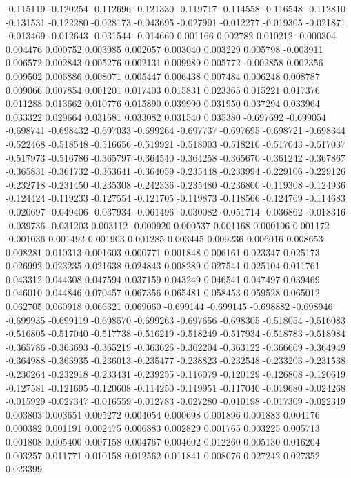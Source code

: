-0.115119
-0.120254
-0.112696
-0.121330
-0.119717
-0.114558
-0.116548
-0.112810
-0.131531
-0.122280
-0.028173
-0.043695
-0.027901
-0.012277
-0.019305
-0.021871
-0.013469
-0.012643
-0.031544
-0.014660
0.001166
0.002782
0.010212
-0.000304
0.004476
0.000752
0.003985
0.002057
0.003040
0.003229
0.005798
-0.003911
0.006572
0.002843
0.005276
0.002131
0.009989
0.005772
-0.002858
0.002356
0.009502
0.006886
0.008071
0.005447
0.006438
0.007484
0.006248
0.008787
0.009066
0.007854
0.001201
0.017403
0.015831
0.023365
0.015221
0.017376
0.011288
0.013662
0.010776
0.015890
0.039990
0.031950
0.037294
0.033964
0.033322
0.029664
0.031681
0.033082
0.031540
0.035380
-0.697692
-0.699054
-0.698741
-0.698432
-0.697033
-0.699264
-0.697737
-0.697695
-0.698721
-0.698344
-0.522468
-0.518548
-0.516656
-0.519921
-0.518003
-0.518210
-0.517043
-0.517037
-0.517973
-0.516786
-0.365797
-0.364540
-0.364258
-0.365670
-0.361242
-0.367867
-0.365831
-0.361732
-0.363641
-0.364059
-0.235448
-0.233994
-0.229106
-0.229126
-0.232718
-0.231450
-0.235308
-0.242336
-0.235480
-0.236800
-0.119308
-0.124936
-0.124424
-0.119233
-0.127554
-0.121705
-0.119873
-0.118566
-0.124769
-0.114683
-0.020697
-0.049406
-0.037934
-0.061496
-0.030082
-0.051714
-0.036862
-0.018316
-0.039736
-0.031203
0.003112
-0.000920
0.000537
0.001168
0.000106
0.001172
-0.001036
0.001492
0.001903
0.001285
0.003445
0.009236
0.006016
0.008653
0.008281
0.010313
0.001603
0.000771
0.001848
0.006161
0.023347
0.025173
0.026992
0.023235
0.021638
0.024843
0.008289
0.027541
0.025104
0.011761
0.043312
0.044308
0.047594
0.037159
0.043249
0.046541
0.047497
0.039469
0.046010
0.044846
0.070457
0.067356
0.065481
0.058453
0.059528
0.065012
0.062705
0.060918
0.066321
0.069060
-0.699144
-0.699145
-0.698882
-0.698946
-0.699935
-0.699119
-0.698570
-0.699263
-0.697656
-0.698305
-0.518054
-0.516083
-0.516805
-0.517040
-0.517738
-0.516219
-0.518249
-0.517934
-0.518783
-0.518984
-0.365786
-0.363693
-0.365219
-0.363626
-0.362204
-0.363122
-0.366669
-0.364949
-0.364988
-0.363935
-0.236013
-0.235477
-0.238823
-0.232548
-0.233203
-0.231538
-0.230264
-0.232918
-0.233431
-0.239255
-0.116079
-0.120129
-0.126808
-0.120619
-0.127581
-0.121695
-0.120608
-0.114250
-0.119951
-0.117040
-0.019680
-0.024268
-0.015929
-0.027347
-0.016559
-0.012783
-0.027280
-0.010198
-0.017309
-0.022319
0.003803
0.003651
0.005272
0.004054
0.000698
0.001896
0.001883
0.004176
0.000382
0.001191
0.002475
0.006883
0.002829
0.001765
0.003225
0.005713
0.001808
0.005400
0.007158
0.004767
0.004602
0.012260
0.005130
0.016204
0.003257
0.011771
0.010158
0.012562
0.011841
0.008076
0.027242
0.027352
0.023399
